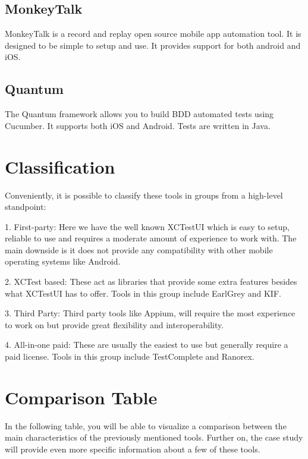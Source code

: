 \subsection {MonkeyTalk}
MonkeyTalk is a record and replay open source mobile app automation tool. It is designed to be simple to setup and use.   It provides support for both android and iOS. \cite{MonkeyTalk}

\subsection {Quantum}
The Quantum framework allows you to build BDD automated tests using Cucumber. It supports both iOS and Android. Tests are written in Java. \cite{Quantum}

\section{Classification}
Conveniently, it is possible to classify these tools in groups from a high-level standpoint:

1. First-party: Here we have the well known XCTestUI which is easy to setup, reliable to use and requires a moderate amount of experience to work with. The main downside is it does not provide any compatibility with other mobile operating systems like Android.

2. XCTest based: These act as libraries that provide some extra features besides what XCTestUI has to offer. Tools in this group include EarlGrey and KIF.

3. Third Party: Third party tools like Appium, will require the most experience to work on but provide great flexibility and interoperability.

4. All-in-one paid:  These are usually the easiest to use but generally require a paid license. Tools in this group include TestComplete and Ranorex.

\section{Comparison Table}

In the following table, you will be able to visualize a comparison between the main characteristics of the previously mentioned tools. Further on, the case study will provide even more specific information about a few of these tools.

